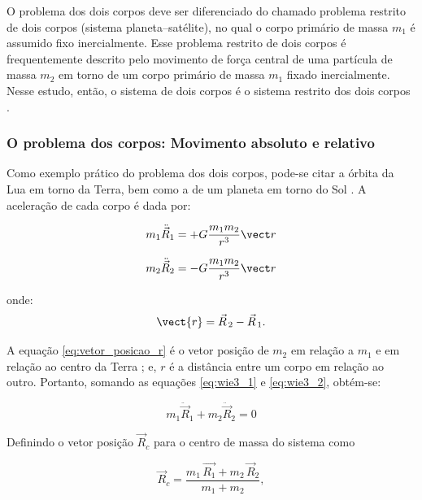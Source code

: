 O problema dos dois corpos deve ser diferenciado do chamado problema restrito de dois corpos (sistema planeta--satélite), no qual o corpo primário de massa $m_1$ é assumido fixo inercialmente. Esse problema restrito de dois corpos é frequentemente descrito pelo movimento de força central de uma partícula de massa $m_2$ em torno de um corpo primário de massa $m_1$ fixado inercialmente.
Nesse estudo, então, o sistema de dois corpos é o sistema restrito dos dois corpos \cite{wie2008space}.

\subsubsection{O problema dos corpos: Movimento absoluto e relativo}

Como exemplo prático do problema dos dois corpos, pode-se citar a órbita da Lua em torno da Terra, bem como a de um planeta em torno do Sol \cite{wgsantos2011}.
A aceleração de cada corpo é dada por:

\begin{equation}
\label{eq:wie3_1}
m_1 \ddot{\vec R}_1 =
+ G \frac{m_1m_2}{r^3} \vect r
\end{equation}

\begin{equation}
\label{eq:wie3_2}
m_2 \ddot{\vec R}_2 =
- G \frac{m_1m_2}{r^3} \vect r
\end{equation}

onde:
\begin{equation}
    \label{eq:vetor_posicao_r}
\vect{r} = \vec R_{\, 2} - \vec R_{\, 1}.
\end{equation}

A equação \eqref{eq:vetor_posicao_r} é o vetor posição de $m_2$ em relação a $m_1$ e em relação ao centro da Terra \cite{wie2008space}; e, $r$ é a distância entre um corpo em relação ao outro. Portanto, somando as equações \eqref{eq:wie3_1} e \eqref{eq:wie3_2}, obtém-se:

\begin{equation}
\label{eq:somaAceleracao_Corpo1e2}
m_1 \ddot{\vec R}_1 + m_2 \ddot{\vec R}_2 = 0
\end{equation}

Definindo o vetor posição $\vec R_{c}$ para o centro de massa do sistema como

\begin{equation}
\vec R_{c} =
\frac{m_1\,\vec {R_1} + m_2\,\vec R_2}{m_1+m_2},
\end{equation}


